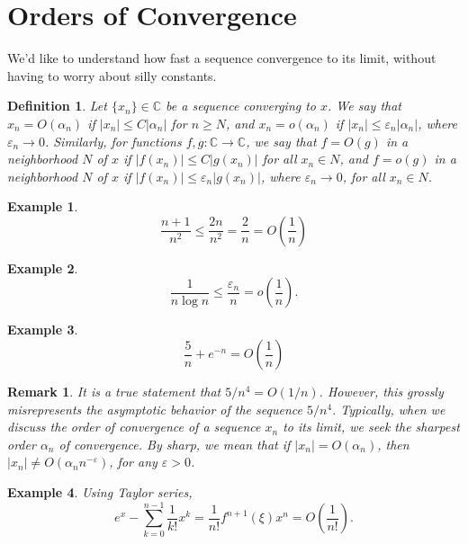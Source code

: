 \documentclass[12pt,reqno]{amsart}
\numberwithin{equation}{section}  %
\newcommand{\cc}{\mathbb{C}}
\newcommand{\ee}{\varepsilon}
\newtheorem{definition}[theorem]{Definition}
\newtheorem{remark}[theorem]{Remark}
\newtheorem{example}{Example}[section]
\begin{document}
\section{Orders of Convergence}
We'd like to understand how fast a sequence convergence to its limit, without
having to worry about silly constants.
\begin{definition}
Let $\{x_{n}\} \in \mathbb{C}$ be a sequence converging to $x$. We say that
$x_{n} = O(\alpha_{n})$ if $|x_{n}| \le C |\alpha_{n}|$  for $n \ge N$, and $ x_n 
= o(\alpha_n )$ if $|x_n| \le \ee_n |\alpha_n |$, where $\ee_n \to 0$.
Similarly, for functions $f,g: \cc \to \cc$, we say that $f = O(g)$ in a
neighborhood $N$ of $x$ if $|f(x_n) | \le C |g(x_n)|$ for all $x_n \in N$, and 
$f = o(g)$ in a neighborhood $N$ of $x$ if $|f(x_n) | \le \ee_n |g(x_n)|$,
where $\ee_n \to 0$,  for all $x_n \in N$.
\end{definition}

\begin{example}
\begin{equation*}
\frac{n+1}{n^2} \le \frac{2n}{n^2} = \frac{2}{n} = O\left(\frac{1}{n} \right)	
\end{equation*}
\end{example}
\begin{example}
\begin{equation*}
\frac{1}{n \log n} \le \frac{\ee_n}{n} = o\left(\frac{1}{n}\right).
\end{equation*}
\end{example}

\begin{example}
\begin{equation*}
\frac{5}{n} + e^{-n} = O\left( \frac{1}{n}\right)
\end{equation*}
\end{example}

\begin{remark}
It is a true statement that $5/n^4 = O(1/n)$. However, this grossly
misrepresents the asymptotic behavior of the sequence $5/n^4$. Typically, when
we discuss the order of convergence of a sequence $x_n$ to its limit, we seek
the sharpest order $\alpha_n$ of convergence. By sharp, we mean that if $|x_n| =
O(\alpha_n)$, then $|x_n| \neq O(\alpha_n n^{-\ee})$, for any $\ee > 0$.
\end{remark}

\begin{example}
Using Taylor series,
\begin{equation*}
e^x - \sum_{k = 0}^{n-1} \frac{1}{k!}x^k = \frac{1}{n!} f^{n+1}(\xi)x^n =
O\left(\frac{1}{n!}\right).
\end{equation*}
\end{example}
\end{document}
